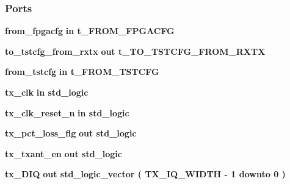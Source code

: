 \subsubsection*{Ports}
 \begin{DoxyCompactItemize}
\item 
{\bf from\+\_\+fpgacfg}  {\bfseries {\bfseries \textcolor{keywordflow}{in}\textcolor{vhdlchar}{ }}} {\bfseries {\bfseries {\bf t\+\_\+\+F\+R\+O\+M\+\_\+\+F\+P\+G\+A\+C\+FG}} \textcolor{vhdlchar}{ }} 
\item 
{\bf to\+\_\+tstcfg\+\_\+from\+\_\+rxtx}  {\bfseries {\bfseries \textcolor{keywordflow}{out}\textcolor{vhdlchar}{ }}} {\bfseries {\bfseries {\bf t\+\_\+\+T\+O\+\_\+\+T\+S\+T\+C\+F\+G\+\_\+\+F\+R\+O\+M\+\_\+\+R\+X\+TX}} \textcolor{vhdlchar}{ }} 
\item 
{\bf from\+\_\+tstcfg}  {\bfseries {\bfseries \textcolor{keywordflow}{in}\textcolor{vhdlchar}{ }}} {\bfseries {\bfseries {\bf t\+\_\+\+F\+R\+O\+M\+\_\+\+T\+S\+T\+C\+FG}} \textcolor{vhdlchar}{ }} 
\item 
{\bf tx\+\_\+clk}  {\bfseries {\bfseries \textcolor{keywordflow}{in}\textcolor{vhdlchar}{ }}} {\bfseries \textcolor{comment}{std\+\_\+logic}\textcolor{vhdlchar}{ }} 
\item 
{\bf tx\+\_\+clk\+\_\+reset\+\_\+n}  {\bfseries {\bfseries \textcolor{keywordflow}{in}\textcolor{vhdlchar}{ }}} {\bfseries \textcolor{comment}{std\+\_\+logic}\textcolor{vhdlchar}{ }} 
\item 
{\bf tx\+\_\+pct\+\_\+loss\+\_\+flg}  {\bfseries {\bfseries \textcolor{keywordflow}{out}\textcolor{vhdlchar}{ }}} {\bfseries \textcolor{comment}{std\+\_\+logic}\textcolor{vhdlchar}{ }} 
\item 
{\bf tx\+\_\+txant\+\_\+en}  {\bfseries {\bfseries \textcolor{keywordflow}{out}\textcolor{vhdlchar}{ }}} {\bfseries \textcolor{comment}{std\+\_\+logic}\textcolor{vhdlchar}{ }} 
\item 
{\bf tx\+\_\+\+D\+IQ}  {\bfseries {\bfseries \textcolor{keywordflow}{out}\textcolor{vhdlchar}{ }}} {\bfseries \textcolor{comment}{std\+\_\+logic\+\_\+vector}\textcolor{vhdlchar}{ }\textcolor{vhdlchar}{(}\textcolor{vhdlchar}{ }\textcolor{vhdlchar}{ }\textcolor{vhdlchar}{ }\textcolor{vhdlchar}{ }{\bfseries {\bf T\+X\+\_\+\+I\+Q\+\_\+\+W\+I\+D\+TH}} \textcolor{vhdlchar}{-\/}\textcolor{vhdlchar}{ } \textcolor{vhdldigit}{1} \textcolor{vhdlchar}{ }\textcolor{keywordflow}{downto}\textcolor{vhdlchar}{ }\textcolor{vhdlchar}{ } \textcolor{vhdldigit}{0} \textcolor{vhdlchar}{ }\textcolor{vhdlchar}{)}\textcolor{vhdlchar}{ }} 

\end{DoxyCompactItemize}
